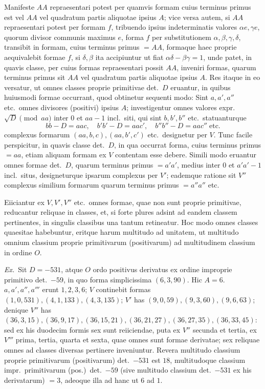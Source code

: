 \documentclass[12pt,a4paper]{article}
\theoremstyle{plain}
\theoremstyle{definition}
\theoremstyle{remark}
\begin{document}
Manifeste $AA$ repraesentari potest per quamvis formam cuius terminus primus est vel $AA$ vel quadratum partis aliquotae ipsius $A$; vice versa autem, si $AA$ repraesentari potest per formam $f$, tribuendo ipsius indeterminatis valores $\alpha e, \gamma e$, quorum divisor communis maximus $e$, forma $f$ per substitutionem $\alpha, \beta, \gamma, \delta$, transibit in formam, cuius terminus primus $= AA$, formaque haec proprie aequivalebit formae $f$, si $\delta, \beta$ ita accipiuntur ut fiat $\alpha\delta - \beta\gamma = 1$, unde patet, in quavis classe, per cuius formas repraesentari possit $AA$, inveniri formas, quarum terminus primus sit $AA$ vel quadratum partis aliquotae ipsius $A$. Res itaque in eo versatur, ut omnes classes proprie primitivae det.\ $D$ eruantur, in quibus huiusmodi formae occurrant, quod obtinetur sequenti modo: Sint $a, a', a''$ etc.\ omnes divisores (positivi) ipsius $A$; investigentur omnes valores expr.\ $\sqrt{D} \pmod{aa}$ inter $0$ et $aa - 1$ incl.\ siti, qui sint $b, b', b''$ etc.\ statuanturque
\[
bb - D = aac, \quad b'b' - D = aac', \quad b''b'' - D = aac'' \; \text{etc.}
\]
complexus formarum $(aa, b, c), (aa, b', c')$ etc.\ designetur per $V$. Tunc facile perspicitur, in quavis classe det.\ $D$, in qua occurrat forma, cuius terminus primus $= aa$, etiam aliquam formam ex $V$ contentam esse debere. Simili modo eruantur omnes formae det.\ $D$, quarum terminus primus $= a'a'$, medius inter $0$ et $a'a' - 1$ incl.\ situs, designeturque ipsarum complexus per $V'$; eademque ratione sit $V''$ complexus similium formarum quarum terminus primus $= a''a''$ etc.

Eiiciantur ex $V, V', V''$ etc.\ omnes formae, quae non sunt proprie primitivae, reducantur reliquae in classes, et, si forte plures adsint ad eandem classem pertinentes, in singulis classibus una tantum retineatur. Hoc modo omnes classes quaesitae habebuntur, eritque harum multitudo ad unitatem, ut multitudo omnium classium proprie primitivarum (positivarum) ad multitudinem classium in ordine $O$.

\textit{Ex.}\ Sit $D = -531$, atque $O$ ordo positivus derivatus ex ordine improprie primitivo det.\ $-59$, in quo forma simplicissima $(6, 3, 90)$. Hic $A = 6$. $a, a', a'', a'''$ erunt $1, 2, 3, 6$; $V$ continebit formas $(1, 0, 531), (4, 1, 133), (4, 3, 135)$; $V'$ has $(9, 0, 59), (9, 3, 60), (9, 6, 63)$; denique $V''$ has $(36, 3, 15), (36, 9, 17), (36, 15, 21), (36, 21, 27), (36, 27, 35), (36, 33, 45)$: sed ex his duodecim formis sex sunt reiiciendae, puta ex $V''$ secunda et tertia, ex $V'''$ prima, tertia, quarta et sexta, quae omnes sunt formae derivatae; sex reliquae omnes ad classes diversas pertinere inveniuntur. Revera multitudo classium proprie primitivarum (positivarum) det.\ $-531$ est $18$, multitudoque classium impr.\ primitivarum (pos.)\ det.\ $-59$ (sive multitudo classium det.\ $-531$ ex his derivatarum) $= 3$, adeoque illa ad hanc ut $6$ ad $1$.
\end{document}
